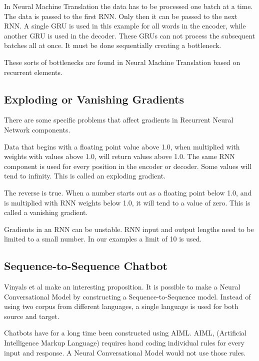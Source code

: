 In Neural Machine Translation the data has to be processed one batch at a time. The data is passed to the first RNN. Only then it can be passed to the next RNN. A single GRU is used in this example for all words in the encoder, while another GRU is used in the decoder. These GRUs can not process the subsequent batches all at once. It must be done sequentially creating a bottleneck. 


These sorts of bottlenecks are found in Neural Machine Translation based on recurrent elements.

\subsection{Exploding or Vanishing Gradients}

\label{section-gru-gradient-problems}

There are some specific problems that affect gradients in Recurrent Neural Network components.

Data that begins with a floating point value above 1.0, when multiplied with weights with  values above 1.0, will return values above 1.0. The same RNN component is used for every position in the encoder or decoder. Some values will tend to infinity. This is called an exploding gradient. 


The reverse is true. When a number starts out as a floating point below 1.0, and is multiplied with RNN weights below 1.0, it will tend to a value of zero. This is called a vanishing gradient.


Gradients in an RNN can be unstable. RNN input and output lengths need to be limited to a small number. In our examples a limit of 10 is used.

\subsection{Sequence-to-Sequence Chatbot}

Vinyals et al \cite{DBLP:journals/corr/VinyalsL15} make an interesting proposition. It is possible to make a Neural Conversational Model by constructing a Sequence-to-Sequence model. Instead of using two corpus from different languages, a single language is used for both source and target.

Chatbots have for a long time been constructed using \ac{AIML}. AIML, (Artificial Intelligence Markup Language) requires hand coding individual rules for every input and response. A Neural Conversational Model would not use those rules.

